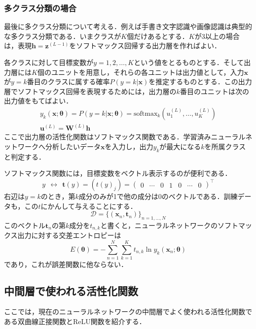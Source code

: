 \documentclass[a4paper,11pt]{jsreport}
\begin{document}
\subsubsection*{多クラス分類の場合}
最後に多クラス分類について考える．例えば手書き文字認識や画像認識は典型的な多クラス分類である．いまクラスが$K$個だけあるとする．$K$が3以上の場合は，表現$\bm{h}=\bm{z}^{(L-1)}$をソフトマックス回帰する出力層を作ればよい．\par
各クラスに対して目標変数が$y=1,2,\dots,K$という値をとるものとする．そして出力層には$K$個のユニットを用意し，それらの各ユニットは出力値として，入力$\bm{x}$が$y=k$番目のクラスに属する確率$P(y=k | \bm{x})$を推定するものとする．この出力層でソフトマックス回帰を表現するためには，出力層の$k$番目のユニットは次の出力値をもてばよい．
\begin{align}
  y_k(\bm{x}; \bm{\theta}) = P(y=k | \bm{x}; \bm{\theta})
  = \text{softmax}_k \left( u_1^{(L)},\dots ,u_K^{(L)} \right) \\
  \bm{u}^{(L)} = \bm{W}^{(L)} \bm{h}
\end{align}
ここで出力層の活性化関数はソフトマックス関数である．学習済みニューラルネットワークへ分析したいデータ$\bm{x}$を入力し，出力$y_k$が最大になる$k$を所属クラスと判定する．\par
ソフトマックス関数には，目標変数をベクトル表示するのが便利である．
\begin{equation}
  y \ \ \longleftrightarrow \ \
  \bm{t}(y)
  = (t(y)_j)
  = \begin{pmatrix}
    0 & \cdots & 0 & 1 & 0 & \cdots & 0
  \end{pmatrix}^{\top}
\end{equation}
右辺は$y=k$のとき，第$k$成分のみが1で他の成分は0のベクトルである．訓練データも，この$t$にかんして与えることにする．
\begin{equation}
  \mathcal{D}
  = \{ (\bm{x}_n, \bm{t}_n) \}_{n=1,\dots,N}
\end{equation}
このベクトル$\bm{t}_n$の第$k$成分を$t_{n,k}$と書くと，ニューラルネットワークのソフトマックス出力に対する交差エントロピーは
\begin{equation}
  E(\bm{\theta}) = -\sum_{n=1}^N \sum_{k=1}^K t_{n,k} \ln{y_k}(\bm{x}_n; \bm{\theta})
\end{equation}
であり，これが誤差関数に他ならない．

\subsection{中間層で使われる活性化関数}
ここでは，現在のニューラルネットワークの中間層でよく使われる活性化関数である双曲線正接関数とReLU関数を紹介する．\par
\end{document}
